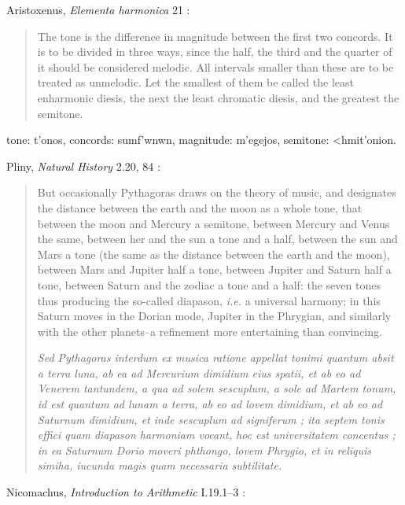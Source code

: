 \documentclass{article}
\newcommand{\textgreek}[1]{\begingroup\fontencoding{LGR}\selectfont#1\endgroup}
\theoremstyle{definition}
\begin{document}
Aristoxenus, {\em Elementa harmonica} 21 \cite[p.~140]{barker}:

\begin{quote}
The tone is the difference in magnitude between the first two
concords. It is to be divided in three ways, since the half, the third and the
quarter of it should be considered melodic. All intervals smaller than these are
to be treated as unmelodic. Let the smallest of them be called the least
enharmonic diesis, the next the least chromatic diesis, and the greatest the
semitone.
\end{quote}

tone: \textgreek{t'onos},
concords: \textgreek{sumf'wnwn},
magnitude: \textgreek{m'egejos},
semitone: \textgreek{<hmit'onion}.

Pliny, {\em Natural History} 2.20, 84 \cite[pp.~226--229]{LCL330}:

\begin{quote}
But occasionally Pythagoras draws on the
theory of music, and designates the distance between
the earth and the moon as a whole tone, that between
the moon and Mercury a semitone, between Mercury
and Venus the same, between her and the sun a tone and a half, between the sun and Mars a tone (the same as the distance between the earth and the
moon), between Mars and Jupiter half a tone,
between Jupiter and Saturn half a tone, between
Saturn and the zodiac a tone and a half: the seven
tones thus producing the so-called diapason, {\em i.e.} a universal harmony;
in this Saturn moves in the Dorian mode, Jupiter in the Phrygian, and similarly
with the other planets--a refinement more entertaining
than convincing.

{\em Sed Pythagoras interdum ex musica ratione appellat tonimi quantum absit a terra luna, ab ea ad
Mercurium dimidium eius spatii, et ab eo ad Venerem
tantundem, a qua ad solem sescuplum, a sole ad
Martem tonum, id est quantum ad lunam a terra,
ab eo ad lovem dimidium, et ab eo ad Saturnum
dimidium, et inde sescuplum ad signiferum ; ita septem tonis effici quam diapason harmoniam vocant,
hoc est universitatem concentus ; in ea Saturnum
Dorio moveri phthongo, lovem Phrygio, et in reliquis
simiha, iucunda magis quam necessaria subtilitate.}
\end{quote}

Nicomachus, {\em Introduction to Arithmetic} I.19.1--3 \cite[p.~215]{nicomachus}:
\end{document}
